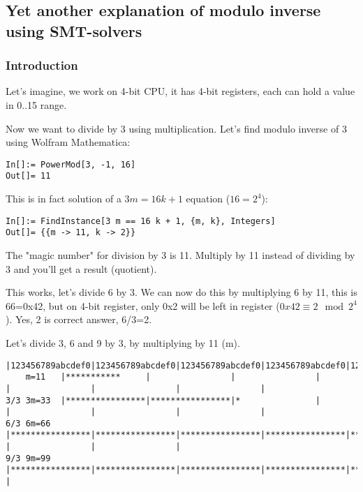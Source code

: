 \subsection{Yet another explanation of modulo inverse using SMT-solvers}

\subsubsection{Introduction}

Let's imagine, we work on 4-bit CPU, it has 4-bit registers, each can hold a value in 0..15 range.

Now we want to divide by 3 using multiplication.
Let's find modulo inverse of 3 using Wolfram Mathematica:

\begin{lstlisting}
In[]:= PowerMod[3, -1, 16]
Out[]= 11
\end{lstlisting}

This is in fact solution of a $3m=16k+1$ equation ($16 = 2^4$):

\begin{lstlisting}
In[]:= FindInstance[3 m == 16 k + 1, {m, k}, Integers]
Out[]= {{m -> 11, k -> 2}}
\end{lstlisting}

The "magic number" for division by 3 is 11. Multiply by 11 instead of dividing by 3 and you'll get a result (quotient).

This works, let's divide 6 by 3. We can now do this by multiplying 6 by 11, this is 66=0x42, but on 4-bit register, only 0x2 will be left in register ($0x42 \equiv 2 \mod 2^4$).
Yes, 2 is correct answer, 6/3=2.

Let's divide 3, 6 and 9 by 3, by multiplying by 11 (m).

\begin{lstlisting}[basicstyle=\tiny]
           |123456789abcdef0|123456789abcdef0|123456789abcdef0|123456789abcdef0|123456789abcdef0|123456789abcdef0|123456789abcdef0|
    m=11   |***********     |                |                |                |                |                |                |
3/3 3m=33  |****************|****************|*               |                |                |                |                |
6/3 6m=66  |****************|****************|****************|****************|**              |                |                |
9/3 9m=99  |****************|****************|****************|****************|****************|****************|***             |
\end{lstlisting}

